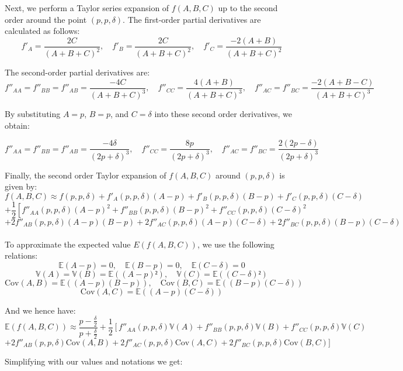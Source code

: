 Next, we perform a Taylor series expansion of \(f(A,B,C)\) up to the second order around the point \((p, p, \delta)\). The first-order partial derivatives are calculated as follows:
\[
f'_A = \frac{2C}{(A + B + C)^2}, \quad f'_B = \frac{2C}{(A + B + C)^2}, \quad f'_C = \frac{-2(A + B)}{(A + B + C)^2}
\]

The second-order partial derivatives are:
\[
f''_{AA} = f''_{BB} = f''_{AB} = \frac{-4C}{(A + B + C)^3}, \quad f''_{CC} = \frac{4(A + B)}{(A + B + C)^3}, \quad f''_{AC} = f''_{BC} = \frac{-2(A + B - C)}{(A + B + C)^3}
\]

By substituting \(A = p\), \(B = p\), and \(C = \delta\) into these second order derivatives, we obtain:

\[
f''_{AA} = f''_{BB} = f''_{AB} = \frac{-4\delta}{(2p + \delta)^3}, \quad f''_{CC} = \frac{8p}{(2p + \delta)^3}, \quad f''_{AC} = f''_{BC} = \frac{2(2p - \delta)}{(2p + \delta)^3}
\]

Finally, the second order Taylor expansion of \(f(A,B,C)\) around \((p,p,\delta)\) is given by:
\[
f(A,B,C) \approx f(p,p,\delta) + f'_A(p,p,\delta)(A - p) + f'_B(p,p,\delta)(B - p) + f'_C(p,p,\delta)(C - \delta)
\]
\[
+ \frac{1}{2} \left[ f''_{AA}(p,p,\delta)(A - p)^2 + f''_{BB}(p,p,\delta)(B - p)^2 + f''_{CC}(p,p,\delta)(C - \delta)^2 \right.
\]
\[
+ 2f''_{AB}(p,p,\delta)(A - p)(B - p) + 2f''_{AC}(p,p,\delta)(A - p)(C - \delta) + 2f''_{BC}(p,p,\delta)(B - p)(C - \delta)
\]\\
To approximate the expected value \( E(f(A,B,C)) \), we use the following relations:
\[
    \mathbb{E}(A - p) = 0, \quad \mathbb{E}(B - p) = 0, \quad \mathbb{E}(C - \delta) = 0
\]
\[
    \mathbb{V}(A) = \mathbb{V}(B) = \mathbb{E}((A - p)²), \quad \mathbb{V}(C) = \mathbb{E}((C - \delta)²)
\]
\[
    \text{Cov}(A, B) = \mathbb{E}((A - p)(B - p)), \quad \text{Cov}(B, C) = \mathbb{E}((B - p)(C - \delta))
\]
\[
    \text{Cov}(A, C) = \mathbb{E}((A - p)(C - \delta))
\]

And we hence have:
\[
    \mathbb{E}(f(A,B,C)) \approx \frac{p - \frac{\delta}{2}}{p + \frac{\delta}{2}} + \frac{1}{2} \left[ f''_{AA}(p,p,\delta)\mathbb{V}(A) + f''_{BB}(p,p,\delta)\mathbb{V}(B) + f''_{CC}(p,p,\delta)\mathbb{V}(C) \right.
\]
\[
+ 2f''_{AB}(p,p,\delta) \text{Cov}(A,B) + 2f''_{AC}(p,p,\delta) \text{Cov}(A,C) + 2f''_{BC}(p,p,\delta) \text{Cov}(B,C)]
\]

Simplifying with our values and notations we get:

